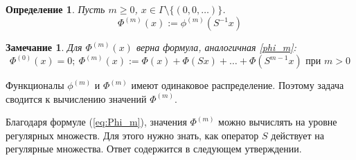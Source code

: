 \documentclass[14pt, a4paper, russian]{report}
\newtheorem{remark}{\indent Замечание}
\newtheorem{definition}{\indent Определение}
\begin{document}
\begin{definition}\label{Phi_m}
Пусть $m \ge 0$, $x \in \Gamma \setminus \{(0,0,\ldots)\}$.
$$ \Phi^{(m)}(x) := \phi^{(m)}(S^{-1}x) $$
\end{definition}
\begin{remark}
Для $\Phi^{(m)}(x)$ верна формула, аналогичная \cref{phi_m}:
\begin{equation}\label{eq:Phi_m}
 \Phi^{(0)}(x)=0;\ \Phi^{(m)}(x):=\Phi(x)+\Phi(Sx)+\ldots+\Phi(S^{m-1}x) \text{ при } m > 0
\end{equation}
\end{remark}
Функционалы $\phi^{(m)}$ и $\Phi^{(m)}$ имеют одинаковое распределение. Поэтому задача сводится к вычислению значений $\Phi^{(m)}$.

Благодаря формуле (\ref{eq:Phi_m}), значения  $\Phi^{(m)}$ можно вычислять на уровне регулярных множеств. Для этого нужно знать, как оператор $S$ действует на регулярные множества. Ответ содержится в следующем утверждении.
\end{document}
